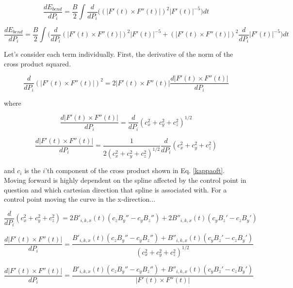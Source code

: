 \documentclass{article}
\begin{document}
\begin{equation}
    \frac{dE_{bend}}{dP_i} =  \frac{B}{2} \int \frac{d}{dP_i} \bigg((|F'(t) \times F''(t)|)^2 |F'(t)|^{-5}\bigg) dt
\end{equation}

\begin{equation}
    \frac{dE_{bend}}{dP_i} =  \frac{B}{2} \int \bigg(\frac{d}{dP_i}(|F'(t) \times F''(t)|)^2 |F'(t)|^{-5} + (|F'(t) \times F''(t)|)^2 \frac{d}{dP_i}|F'(t)|^{-5}\bigg) dt
    \label{dE_benddP_i}
\end{equation}

Let's consider each term individually. First, the derivative of the norm of the cross product squared.

\begin{equation}
    \frac{d}{dP_i}(|F'(t) \times F''(t)|)^2 = 2 |F'(t) \times F''(t)| \frac{d|F'(t) \times F''(t)|}{dP_i}
    \label{devsquarenormcross}
\end{equation}

\noindent
where

\begin{equation}
    \frac{d|F'(t) \times F''(t)|}{dP_i} = \frac{d}{dP_i}(c_x^2 + c_y^2 + c_z^2)^{1/2}
\end{equation}

\begin{equation}
    \frac{d|F'(t) \times F''(t)|}{dP_i} = \frac{1}{2(c_x^2 + c_y^2 + c_z^2)^{1/2}} \frac{d}{dP_i} (c_x^2 + c_y^2 + c_z^2)
\end{equation}

\noindent
and $c_i$ is the $i$'th component of the cross product shown in Eq. \ref{kappaoft}. Moving forward is highly dependent on the spline affected by the control point in question and which cartesian direction that spline is associated with. For a control point moving the curve in the x-direction...


\begin{equation}
    \frac{d}{dP_i} (c_x^2 + c_y^2 + c_z^2) = 2B'_{i,k,x}(t)(c_zB_y''-c_yB_z'') + 2B''_{i,k,x}(t)(c_yB_z' - c_zB_y')
\end{equation}

\begin{equation}
    \frac{d|F'(t) \times F''(t)|}{dP_i} = \frac{B'_{i,k,x}(t)(c_zB_y''-c_yB_z'') + B''_{i,k,x}(t)(c_yB_z' - c_zB_y')}{(c_x^2 + c_y^2 + c_z^2)^{1/2}}
\end{equation}

\begin{equation}
    \frac{d|F'(t) \times F''(t)|}{dP_i} = \frac{B'_{i,k,x}(t)(c_zB_y''-c_yB_z'') + B''_{i,k,x}(t)(c_yB_z' - c_zB_y')}{|F'(t) \times F''(t)|}
\end{equation}
\end{document}
